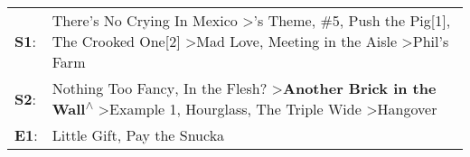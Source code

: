 \begin{supertabular}{p{0.03\textwidth}p{0.92\textwidth}}
 \textbf{S1}:  &  There's No Crying In Mexico\textsuperscript{} \textgreater {}'s Theme\textsuperscript{}, \enspace \#5\textsuperscript{}, \enspace Push the Pig[1]\textsuperscript{}, \enspace The Crooked One[2]\textsuperscript{} \textgreater \enspace Mad Love\textsuperscript{}, \enspace Meeting in the Aisle\textsuperscript{} \textgreater \enspace Phil's Farm\textsuperscript{}  \enspace  \\
 \textbf{S2}:  &                              Nothing Too Fancy\textsuperscript{}, \enspace In the Flesh?\textsuperscript{} \textgreater \enspace \textbf{Another Brick in the Wall\textsuperscript{$\wedge$}} \textgreater \enspace Example 1\textsuperscript{}, \enspace Hourglass\textsuperscript{}, \enspace The Triple Wide\textsuperscript{} \textgreater \enspace Hangover\textsuperscript{}  \enspace  \\
 \textbf{E1}:  &                                                                                                                                                                                                                                                                                                           Little Gift\textsuperscript{}, \enspace Pay the Snucka\textsuperscript{}  \enspace  \\
\end{supertabular}
